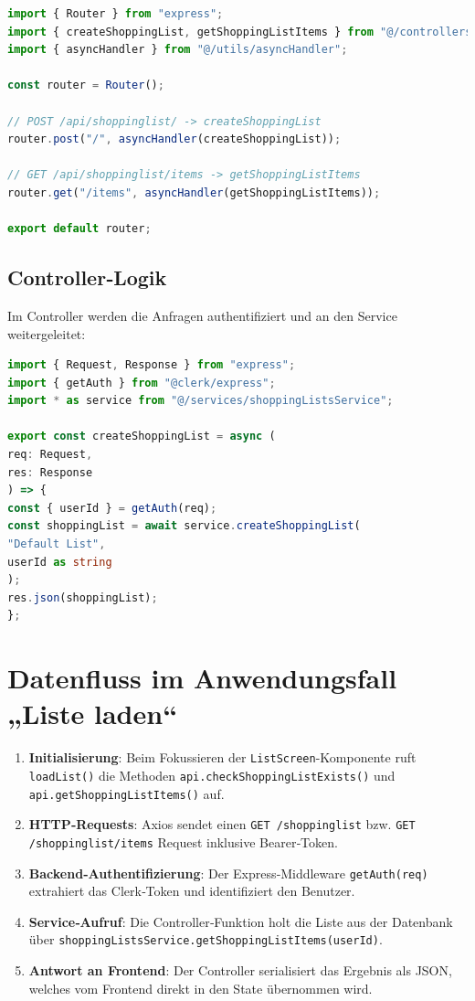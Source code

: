 \documentclass[12pt, a4paper]{report} %
\begin{document}
\begin{lstlisting}[language=TypeScript,caption={Routing des Einkaufslisten‑Endpoints im Backend (\texttt{shoppingLists.ts})}]
import { Router } from "express";
import { createShoppingList, getShoppingListItems } from "@/controllers/shoppingListsController";
import { asyncHandler } from "@/utils/asyncHandler";

const router = Router();

// POST /api/shoppinglist/ -> createShoppingList
router.post("/", asyncHandler(createShoppingList));

// GET /api/shoppinglist/items -> getShoppingListItems
router.get("/items", asyncHandler(getShoppingListItems));

export default router;
\end{lstlisting}

\subsection{Controller‑Logik}
Im Controller werden die Anfragen authentifiziert und an den Service weitergeleitet:

\begin{lstlisting}[language=TypeScript,caption={Erstellen eines Einkaufslisten‑Eintrags im Backend (\texttt{shoppingListsController.ts})}]
import { Request, Response } from "express";
import { getAuth } from "@clerk/express";
import * as service from "@/services/shoppingListsService";

export const createShoppingList = async (
req: Request,
res: Response
) => {
const { userId } = getAuth(req);
const shoppingList = await service.createShoppingList(
"Default List",
userId as string
);
res.json(shoppingList);
};
\end{lstlisting}

\section{Datenfluss im Anwendungsfall „Liste laden“}
\begin{enumerate}
\item \textbf{Initialisierung}: Beim Fokussieren der \texttt{ListScreen}-Komponente ruft \texttt{loadList()} die Methoden \texttt{api.checkShoppingListExists()} und \texttt{api.getShoppingListItems()} auf.
\item \textbf{HTTP‑Requests}: Axios sendet einen \texttt{GET /shoppinglist} bzw. \texttt{GET /shoppinglist/items} Request inklusive Bearer‑Token.
\item \textbf{Backend‑Authentifizierung}: Der Express‑Middleware \texttt{getAuth(req)} extrahiert das Clerk‑Token und identifiziert den Benutzer.
\item \textbf{Service‑Aufruf}: Die Controller‑Funktion holt die Liste aus der Datenbank über \texttt{shoppingListsService.getShoppingListItems(userId)}.
\item \textbf{Antwort an Frontend}: Der Controller serialisiert das Ergebnis als JSON, welches vom Frontend direkt in den State übernommen wird.
\end{enumerate}
\end{document}
